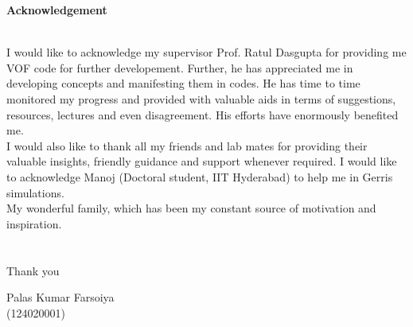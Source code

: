 \begin{center}
\textbf{\large Acknowledgement} 
\end{center}
\indent \\
\indent I would like to acknowledge my supervisor Prof. Ratul Dasgupta for providing me VOF code for further developement. Further, he has appreciated me in developing concepts and manifesting them in codes. He has time to time monitored my progress and provided with valuable aids in terms of suggestions, resources, lectures and even disagreement. His efforts have enormously benefited me.\\
\indent I would also like to thank all my friends and lab mates for providing their valuable insights, friendly guidance and support whenever required. I would like to acknowledge Manoj (Doctoral student, IIT Hyderabad) to help me in Gerris simulations.\\
\indent My wonderful family, which has been my constant source of motivation and inspiration. \\
\\
\\
\indent
Thank you
\vspace*{1.6cm}

Palas Kumar Farsoiya\\
\indent (124020001)
